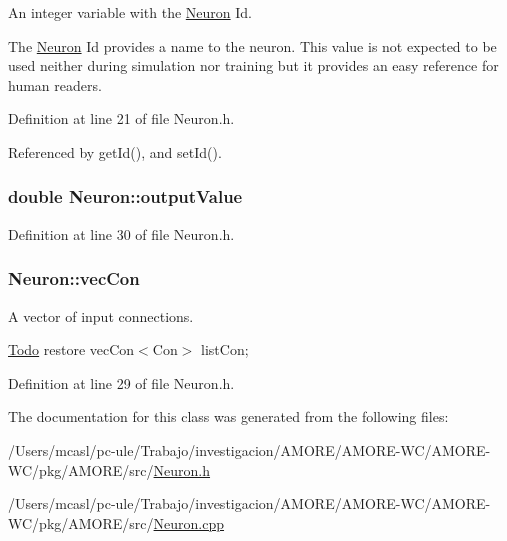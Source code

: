 An integer variable with the \hyperlink{class_neuron}{Neuron} Id. 

The \hyperlink{class_neuron}{Neuron} Id provides a name to the neuron. This value is not expected to be used neither during simulation nor training but it provides an easy reference for human readers. 

Definition at line 21 of file Neuron.h.



Referenced by getId(), and setId().

\hypertarget{class_neuron_ada029047646c36e525a6a1b77cafc03c}{
\subsubsection[{outputValue}]{\setlength{\rightskip}{0pt plus 5cm}double {\bf Neuron::outputValue}}}
\label{class_neuron_ada029047646c36e525a6a1b77cafc03c}


Definition at line 30 of file Neuron.h.

\hypertarget{class_neuron_a28b999e1d31bb81ac2092eb15c9a7d17}{
\subsubsection[{vecCon}]{ {\bf Neuron::vecCon}}}
\label{class_neuron_a28b999e1d31bb81ac2092eb15c9a7d17}


A vector of input connections. 

\begin{Desc}
\item[\hyperlink{todo__todo000001}{Todo}]restore vecCon$<$Con$>$ listCon; \end{Desc}


Definition at line 29 of file Neuron.h.



The documentation for this class was generated from the following files:\begin{DoxyCompactItemize}
\item 
/Users/mcasl/pc-\/ule/Trabajo/investigacion/AMORE/AMORE-\/WC/AMORE-\/WC/pkg/AMORE/src/\hyperlink{_neuron_8h}{Neuron.h}\item 
/Users/mcasl/pc-\/ule/Trabajo/investigacion/AMORE/AMORE-\/WC/AMORE-\/WC/pkg/AMORE/src/\hyperlink{_neuron_8cpp}{Neuron.cpp}\end{DoxyCompactItemize}
